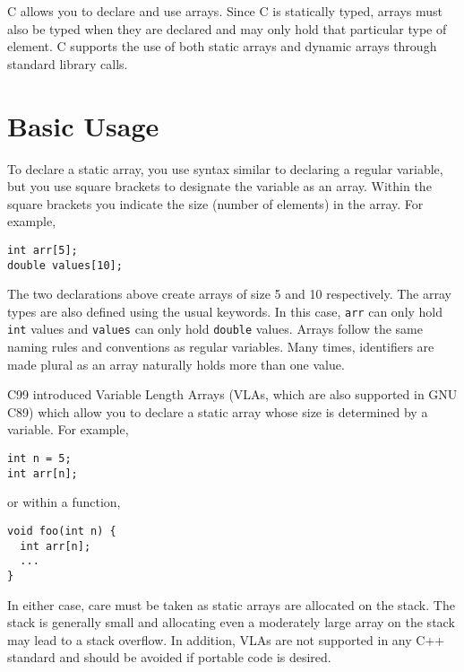 

C allows you to declare and use arrays.  Since C is statically
typed, arrays must also be typed when they are declared and
may only hold that particular type of element.  C supports the
use of both static arrays and dynamic arrays through standard
library calls.

\section{Basic Usage}

To declare a static array, you use syntax similar to declaring
a regular variable, but you use square brackets to designate
the variable as an array.  Within the square brackets you
indicate the size (number of elements) in the array.  For
example, 

\begin{verbatim}
int arr[5];
double values[10];
\end{verbatim}

The two declarations above create arrays of size 5 and 10 
respectively.  The array types are also defined using the usual
keywords.  In this case, \texttt{arr} can only hold
\texttt{int} values and \texttt{values} can only
hold \texttt{double} values.  Arrays follow the same
naming rules and conventions as regular variables.  Many 
times, identifiers are made plural as an array naturally holds
more than one value.  

C99 introduced Variable Length Arrays (VLAs, which are also 
supported in GNU C89) which allow you to declare a static
array whose size is determined by a variable.  For example, 

\begin{verbatim}
int n = 5;
int arr[n];
\end{verbatim}

or within a function, 

\begin{verbatim}
void foo(int n) {
  int arr[n];
  ...
}
\end{verbatim}

In either case, care must be taken as static arrays are allocated
on the stack.  The stack is generally small and allocating even a
moderately large array on the stack may lead to a stack overflow.
In addition, VLAs are not supported in any C++ standard and
should be avoided if portable code is desired.

